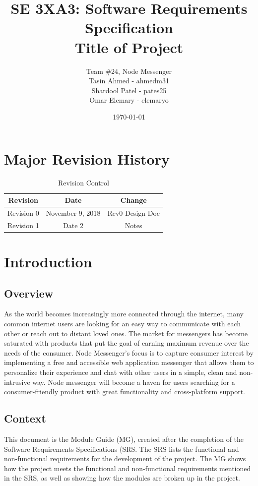 \documentclass[12pt, titlepage]{article}
\title{SE 3XA3: Software Requirements Specification\\Title of Project}
\author{Team \#24, Node Messenger
		\\ Tasin Ahmed - ahmedm31
		\\ Shardool Patel - pates25
		\\ Omar Elemary - elemaryo
}
\date{\today}
\begin{document}
\maketitle

\tableofcontents
\listoftables
\listoffigures

\section{Major Revision History}
\begin{table}[h!]
\centering
\begin{tabular}{ccc}
\hline 
Revision & Date & Change \\ 
\hline 
Revision 0 & November 9, 2018 & Rev0 Design Doc \\ 
Revision 1 & Date 2 & Notes \\ 
\hline 
\end{tabular} 
\caption{Revision Control}
\label{my-label}
\end{table}


\section{Introduction}
\subsection{Overview}
As the world becomes increasingly more connected through the internet, many common internet users are looking for an easy way to communicate with each other or reach out to distant loved ones. The market for messengers has become saturated with products that put the goal of earning maximum revenue over the needs of the consumer. Node Messenger's focus is to capture consumer interest by implementing a free and accessible web application messenger that allows them to personalize their experience and chat with other users in a simple, clean and non-intrusive way. Node messenger will become a haven for users searching for a consumer-friendly product with great functionality and cross-platform support.

\subsection{Context}
This document is the Module Guide (MG), created after the completion of the Software Requirements Specifications (SRS. The SRS lists the functional and non-functional requirements for the development of the project. The MG shows how the project meets the functional and non-functional requirements mentioned in the SRS, as well as showing how the modules are broken up in the project.
\end{document}
